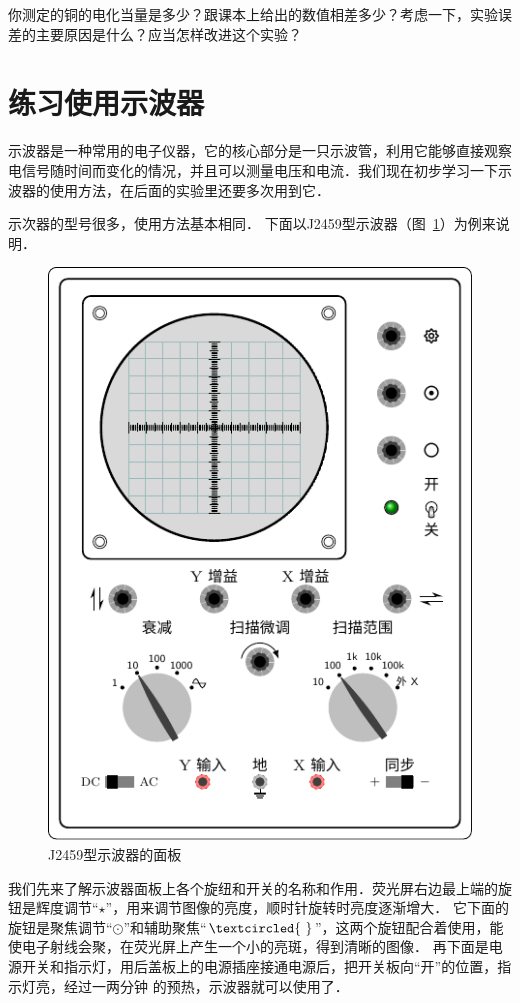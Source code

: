 你测定的铜的电化当量是多少？跟课本上给出的数值相差多少？考虑一下，实验误差的主要原因是什么？应当怎样改进这个实验？

\section{练习使用示波器}
示波器是一种常用的电子仪器，它的核心部分是一只示波管，利用它能够直接观察电信号随时间而变化的情况，并且可以测量电压和电流．我们现在初步学习一下示波器的使用方法，在后面的实验里还要多次用到它．

示次器的型号很多，使用方法基本相同．
下面以J2459型示波器（图~\ref{fig_B_9-13}）为例来说明．
\begin{figure}[htbp]
    \centering
    \includegraphics{fig/B/9-13.pdf}
    \caption{J2459型示波器的面板}\label{fig_B_9-13}
\end{figure}

我们先来了解示波器面板上各个旋纽和开关的名称和作用．荧光屏右边最上端的旋钮是辉度调节“$\star$”，用来调节图像的亮度，顺时针旋转时亮度逐渐增大．
它下面的旋钮是聚焦调节“$\odot$”和辅助聚焦“$\textcircled{~}$”，这两个旋钮配合着使用，能使电子射线会聚，在荧光屏上产生一个小的亮斑，得到清晰的图像．
再下面是电源开关和指示灯，用后盖板上的电源插座接通电源后，把开关板向“开”的位置，指示灯亮，经过一两分钟
的预热，示波器就可以使用了．

